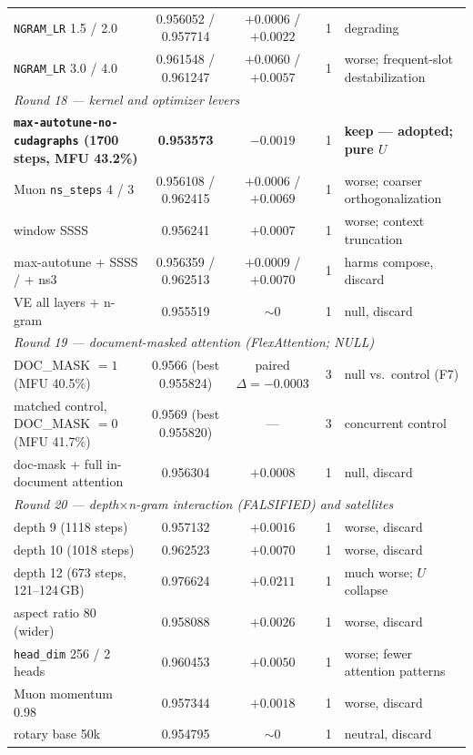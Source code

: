 \documentclass{article}
\begin{document}
\begin{table}[t]
\begin{center}
\begin{small}
\begin{tabular}{lcccl}
\texttt{NGRAM\_LR} 1.5 / 2.0 & 0.956052 / 0.957714 & $+0.0006$ / $+0.0022$ & 1 & degrading \\
\texttt{NGRAM\_LR} 3.0 / 4.0 & 0.961548 / 0.961247 & $+0.0060$ / $+0.0057$ & 1 & worse; frequent-slot destabilization \\
\midrule
\multicolumn{5}{l}{\emph{Round 18 --- kernel and optimizer levers}} \\
\textbf{\texttt{max-autotune-no-cudagraphs} (1700 steps, MFU 43.2\%)} & \textbf{0.953573} & $-0.0019$ & 1 & \textbf{keep --- adopted; pure $U$} \\
Muon \texttt{ns\_steps} 4 / 3 & 0.956108 / 0.962415 & $+0.0006$ / $+0.0069$ & 1 & worse; coarser orthogonalization \\
window SSSS & 0.956241 & $+0.0007$ & 1 & worse; context truncation \\
max-autotune + SSSS / + ns3 & 0.956359 / 0.962513 & $+0.0009$ / $+0.0070$ & 1 & harms compose, discard \\
VE all layers + n-gram & 0.955519 & $\sim 0$ & 1 & null, discard \\
\midrule
\multicolumn{5}{l}{\emph{Round 19 --- document-masked attention (FlexAttention; NULL)}} \\
DOC\_MASK $= 1$ (MFU 40.5\%) & 0.9566 (best 0.955824) & paired $\Delta = -0.0003$ & 3 & null vs.\ control (F7) \\
matched control, DOC\_MASK $= 0$ (MFU 41.7\%) & 0.9569 (best 0.955820) & --- & 3 & concurrent control \\
doc-mask + full in-document attention & 0.956304 & $+0.0008$ & 1 & null, discard \\
\midrule
\multicolumn{5}{l}{\emph{Round 20 --- depth$\times$n-gram interaction (FALSIFIED) and satellites}} \\
depth 9 (1118 steps) & 0.957132 & $+0.0016$ & 1 & worse, discard \\
depth 10 (1018 steps) & 0.962523 & $+0.0070$ & 1 & worse, discard \\
depth 12 (673 steps, 121--124\,GB) & 0.976624 & $+0.0211$ & 1 & much worse; $U$ collapse \\
aspect ratio 80 (wider) & 0.958088 & $+0.0026$ & 1 & worse, discard \\
\texttt{head\_dim} 256 / 2 heads & 0.960453 & $+0.0050$ & 1 & worse; fewer attention patterns \\
Muon momentum 0.98 & 0.957344 & $+0.0018$ & 1 & worse, discard \\
rotary base 50k & 0.954795 & $\sim 0$ & 1 & neutral, discard \\
\bottomrule
\end{tabular}
\end{small}
\end{center}
\vskip -0.1in
\end{table}
\end{document}
